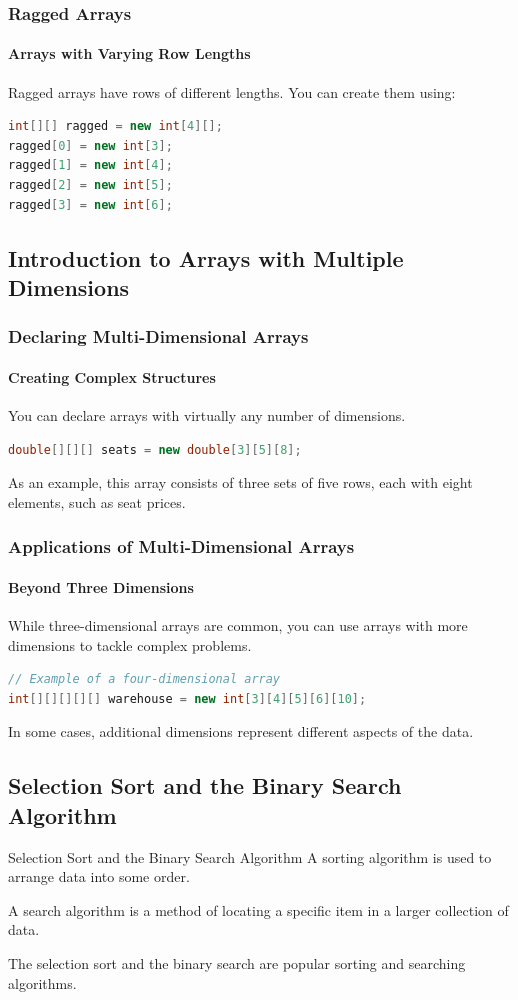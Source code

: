 \documentclass[11pt]{beamer}
\begin{document}
\begin{frame}[fragile]
\frametitle{Ragged Arrays}
\framesubtitle{Arrays with Varying Row Lengths}

Ragged arrays have rows of different lengths. You can create them using:

\begin{lstlisting}[language=Java]
int[][] ragged = new int[4][];
ragged[0] = new int[3];
ragged[1] = new int[4];
ragged[2] = new int[5];
ragged[3] = new int[6];
\end{lstlisting}
\end{frame}

\subsection{Introduction to Arrays with Multiple Dimensions}
\begin{frame}[fragile]
\frametitle{Declaring Multi-Dimensional Arrays}
\framesubtitle{Creating Complex Structures}

You can declare arrays with virtually any number of dimensions.
\begin{lstlisting}[language=Java]
double[][][] seats = new double[3][5][8];
\end{lstlisting}
As an example, this array consists of three sets of five rows, each with eight elements, such as seat prices.
\end{frame}

\begin{frame}[fragile]
\frametitle{Applications of Multi-Dimensional Arrays}
\framesubtitle{Beyond Three Dimensions}

While three-dimensional arrays are common, you can use arrays with more dimensions to tackle complex problems.

\begin{lstlisting}[language=Java]
// Example of a four-dimensional array
int[][][][][] warehouse = new int[3][4][5][6][10];
\end{lstlisting}
In some cases, additional dimensions represent different aspects of the data.
\end{frame}

\subsection{Selection Sort and the Binary Search Algorithm}
\begin{frame}{Selection Sort and the Binary Search Algorithm}
    A sorting algorithm is used to arrange data into some order. \\ \vspace{1em}

    A search algorithm is a method of locating a specific item in a larger collection of data. \\ \vspace{1em}
    
    The selection sort and the binary search are popular sorting and searching algorithms.
\end{frame}
\end{document}
